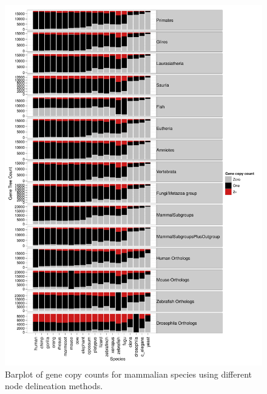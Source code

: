 \begin{figure}[t]
\begin{center}
\includegraphics[scale=0.6]{Figs/Mammals1_Fig2.pdf}
\end{center}
\caption{Barplot of gene copy counts for mammalian species using different node delineation methods.}
\label{mammals1_fig1}
\end{figure}

